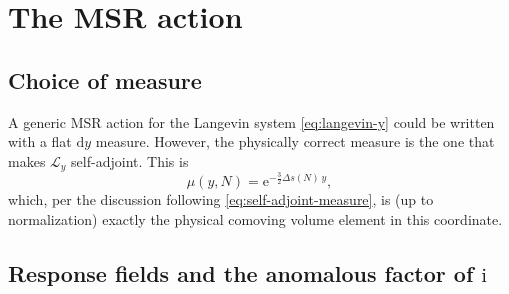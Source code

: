 \documentclass[a4paper,11pt]{article}
\renewcommand{\d}{\mathrm{d}}
\newcommand{\e}[1]{\mathrm{e}^{{#1}}}
\newcommand{\im}{\mathrm{i}}
\newcommand{\Ny}{N}                          %
\newcommand{\yco}{y}                         %
\newcommand{\Deltas}{\Delta s}                %
\newcommand{\measure}{\mu}                   %
\newcommand{\Lop}{\mathcal{L}_\yco}          %
\begin{document}
\section{The MSR action}
\label{sec:msr-action}

\subsection{Choice of measure}

A generic MSR action for the Langevin system \eqref{eq:langevin-y} could be
written with a flat $\d\yco$ measure. However, the physically correct
measure is the one that makes $\Lop$ self-adjoint. This is
\begin{equation}
    \measure(\yco,\Ny) = \e{-\frac32\Deltas(\Ny)\,\yco} ,
\end{equation}
which, per the discussion following \eqref{eq:self-adjoint-measure}, is
(up to normalization) exactly the physical comoving volume element in this
coordinate.

\subsection{Response fields and the anomalous factor of $\im$}
\label{sec:response-rotation}
\end{document}
